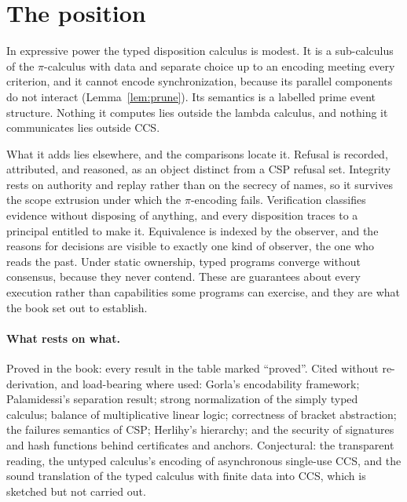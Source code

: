 \documentclass[11pt,openany]{book}
\theoremstyle{remark}
\begin{document}
\section{The position}

In expressive power the typed disposition calculus is modest. It is a
sub-calculus of the $\pi$-calculus with data and separate choice up to an
encoding meeting every criterion, and it cannot encode synchronization,
because its parallel components do not interact
(Lemma~\ref{lem:prune}). Its semantics is a labelled prime event
structure. Nothing it computes lies outside the lambda calculus, and
nothing it communicates lies outside CCS.

What it adds lies elsewhere, and the comparisons locate it. Refusal is
recorded, attributed, and reasoned, as an object distinct from a CSP
refusal set. Integrity rests on authority and replay rather than on the
secrecy of names, so it survives the scope extrusion under which the
$\pi$-encoding fails. Verification classifies evidence without disposing
of anything, and every disposition traces to a principal entitled to make
it. Equivalence is indexed by the observer, and the reasons for decisions
are visible to exactly one kind of observer, the one who reads the past.
Under static ownership, typed programs converge without consensus,
because they never contend. These are guarantees about every execution rather than
capabilities some programs can exercise, and they are what the book set
out to establish.

\paragraph{What rests on what.} Proved in the book: every result in the
table marked ``proved''. Cited without re-derivation, and load-bearing
where used: Gorla's encodability framework; Palamidessi's separation
result; strong normalization of the simply typed calculus; balance of
multiplicative linear logic; correctness of bracket abstraction; the
failures semantics of CSP; Herlihy's hierarchy; and the security of
signatures and hash functions behind certificates and anchors.
Conjectural: the transparent reading, the untyped calculus's encoding of
asynchronous single-use CCS, and the sound translation of the typed
calculus with finite data into CCS, which is sketched but not carried out.

\appendix
\end{document}
